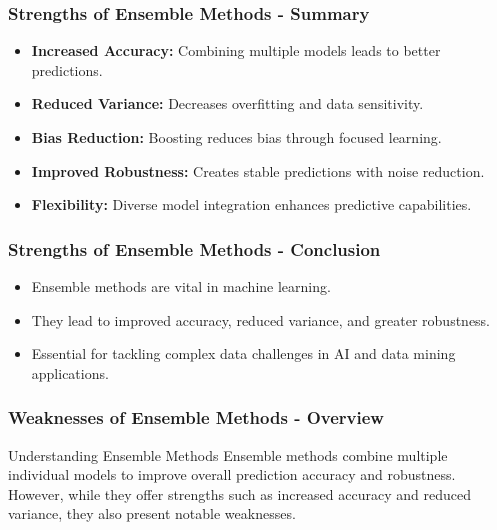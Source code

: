 \documentclass[aspectratio=169]{beamer}
\begin{document}
\begin{frame}[fragile]
    \frametitle{Strengths of Ensemble Methods - Summary}
    \begin{itemize}
        \item \textbf{Increased Accuracy:} Combining multiple models leads to better predictions.
        \item \textbf{Reduced Variance:} Decreases overfitting and data sensitivity.
        \item \textbf{Bias Reduction:} Boosting reduces bias through focused learning.
        \item \textbf{Improved Robustness:} Creates stable predictions with noise reduction.
        \item \textbf{Flexibility:} Diverse model integration enhances predictive capabilities.
    \end{itemize}
\end{frame}

\begin{frame}[fragile]
    \frametitle{Strengths of Ensemble Methods - Conclusion}
    \begin{itemize}
        \item Ensemble methods are vital in machine learning.
        \item They lead to improved accuracy, reduced variance, and greater robustness.
        \item Essential for tackling complex data challenges in AI and data mining applications.
    \end{itemize}
\end{frame}

\begin{frame}[fragile]
    \frametitle{Weaknesses of Ensemble Methods - Overview}
    \begin{block}{Understanding Ensemble Methods}
        Ensemble methods combine multiple individual models to improve overall prediction accuracy and robustness. However, while they offer strengths such as increased accuracy and reduced variance, they also present notable weaknesses.
    \end{block}
\end{frame}
\end{document}
